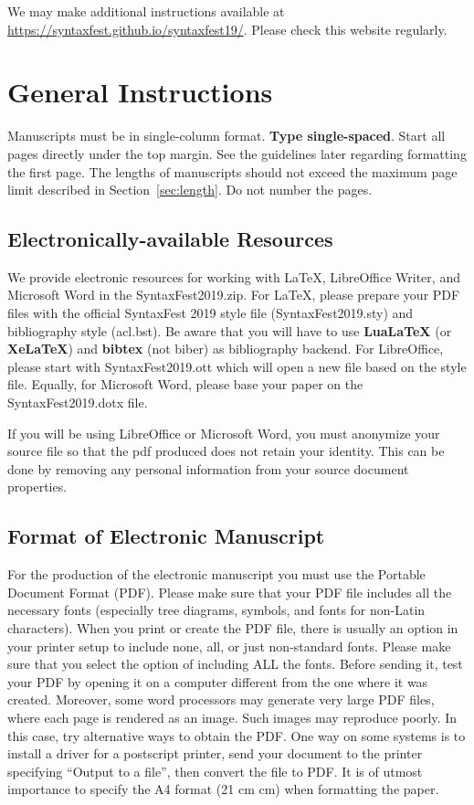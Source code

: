 \documentclass[11pt]{article}
\begin{document}
We may make additional instructions available at \url{https://syntaxfest.github.io/syntaxfest19/}. Please check this website regularly.



\section{General Instructions}

Manuscripts must be in single-column format. {\bf Type single-spaced}. Start all pages directly under the top margin. See the guidelines later regarding formatting the first page. The lengths of manuscripts should not exceed the maximum page limit described in Section~\ref{sec:length}.
Do not number the pages.


\subsection{Electronically-available Resources}

We provide electronic resources for working with LaTeX, LibreOffice Writer, and Microsoft Word in the SyntaxFest2019.zip. For LaTeX, please prepare your PDF files with the official SyntaxFest 2019 style file (SyntaxFest2019.sty) and bibliography style (acl.bst). Be aware that you will have to use {\bf LuaLaTeX} (or {\bf XeLaTeX}) and {\bf bibtex} (not biber) as bibliography backend. For LibreOffice, please start with SyntaxFest2019.ott which will open a new file based on the style file. Equally, for Microsoft Word, please base your paper on the SyntaxFest2019.dotx file.

If you will be using LibreOffice or Microsoft Word, you must anonymize your source file so that the pdf produced does not retain your identity. This can be done by removing any personal information from your source document properties.


\subsection{Format of Electronic Manuscript}
\label{sect:pdf}

For the production of the electronic manuscript you must use the Portable Document Format (PDF). Please make sure that your PDF file includes all the necessary fonts (especially tree diagrams, symbols, and fonts for non-Latin characters). When you print or create the PDF file, there is usually an option in your printer setup to include none, all, or just non-standard fonts. Please make sure that you select the option of including ALL the fonts. Before sending it, test your PDF by opening it on a computer different from the one where it was created. Moreover, some word processors may generate very large PDF files, where each page is rendered as an image. Such images may reproduce poorly. In this case, try alternative ways to obtain the PDF. One way on some systems is to install a driver for a postscript printer, send your document to the printer specifying ``Output to a file'', then convert the file to PDF. It is of utmost importance to specify the A4 format (21 cm  cm) when formatting the paper. 
\end{document}
